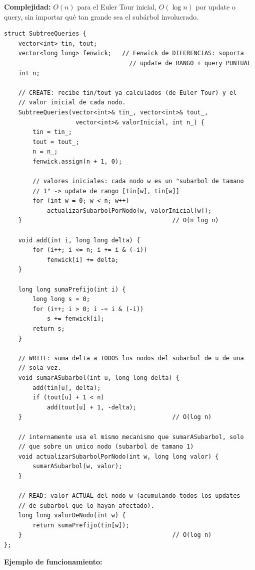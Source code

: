 \documentclass[10pt,a4paper,twocolumn]{article}
\begin{document}
\textbf{Complejidad:} $O(n)$ para el Euler Tour inicial, $O(\log n)$
por update o query, sin importar qué tan grande sea el subárbol
involucrado.

\begin{lstlisting}[style=cpp]
struct SubtreeQueries {
    vector<int> tin, tout;
    vector<long long> fenwick;   // Fenwick de DIFERENCIAS: soporta
                                   // update de RANGO + query PUNTUAL
    int n;

    // CREATE: recibe tin/tout ya calculados (de Euler Tour) y el
    // valor inicial de cada nodo.
    SubtreeQueries(vector<int>& tin_, vector<int>& tout_,
                    vector<int>& valorInicial, int n_) {
        tin = tin_;
        tout = tout_;
        n = n_;
        fenwick.assign(n + 1, 0);

        // valores iniciales: cada nodo w es un "subarbol de tamano
        // 1" -> update de rango [tin[w], tin[w]]
        for (int w = 0; w < n; w++)
            actualizarSubarbolPorNodo(w, valorInicial[w]);
    }                                          // O(n log n)

    void add(int i, long long delta) {
        for (i++; i <= n; i += i & (-i))
            fenwick[i] += delta;
    }

    long long sumaPrefijo(int i) {
        long long s = 0;
        for (i++; i > 0; i -= i & (-i))
            s += fenwick[i];
        return s;
    }

    // WRITE: suma delta a TODOS los nodos del subarbol de u de una
    // sola vez.
    void sumarASubarbol(int u, long long delta) {
        add(tin[u], delta);
        if (tout[u] + 1 < n)
            add(tout[u] + 1, -delta);
    }                                          // O(log n)

    // internamente usa el mismo mecanismo que sumarASubarbol, solo
    // que sobre un unico nodo (subarbol de tamano 1)
    void actualizarSubarbolPorNodo(int w, long long valor) {
        sumarASubarbol(w, valor);
    }

    // READ: valor ACTUAL del nodo w (acumulando todos los updates
    // de subarbol que lo hayan afectado).
    long long valorDeNodo(int w) {
        return sumaPrefijo(tin[w]);
    }                                          // O(log n)
};
\end{lstlisting}

\textbf{Ejemplo de funcionamiento:}
\end{document}
